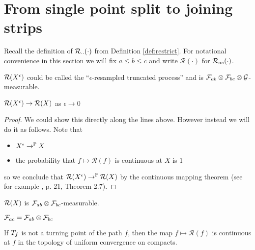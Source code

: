 {
\section{From single point split to joining strips}

\newcommand{\Res}[1]{\mathcal{R}(#1)}

Recall the definition of $\mathcal{R}_{{\cdot}{\cdot}}(\cdot)$ from
Definition \ref{def:restrict}.  For notational convenience in this
section we will fix $a \le b \le c$ and write $\Res{\cdot}$ for
$\mathcal{R}_{{a}{c}}(\cdot)$.

\newcommand{\AuB}{A \cup B}
\newcommand{\F}{\mathcal{F}}

\newcommand{\sampledT}{\sampled^T}
\newcommand{\sampledTe}{\sampled^{T,\epsilon}}
\newcommand{\resampledeT}{{\resamplede}^{,T}}

\begin{obs}
  $\Res{\resamplede}$ could be called the ``$\epsilon$-resampled
  truncated process'' and is $\mathcal{F}_{a b} \otimes \mathcal{F}_{b c}
  \otimes \mathcal{G}$-measurable.
\end{obs}

\begin{lemma}
  $\Res{\resamplede} \to \Res{\sampled}$ as $\epsilon \to 0$
\end{lemma}

\begin{proof}
  We could show this directly along the lines above.  However instead
  we will do it as follows.  Note that
  \begin{itemize}
  \item $X^{\epsilon} \to^{\mathbb{P}} X$
  \item the probability that $f \mapsto \Res{f}$ is continuous
    at $X$ is $1$
  \end{itemize}
  so we conclude that $\Res{\resamplede} \to^\P
  \Res{\sampled}$ by the continuous mapping theorem (see for
  example \cite{billingsley}, p. 21, Theorem 2.7).
\end{proof}

\begin{lemma}
  $\Res{\sampled}$ is $\mathcal{F}_{a b} \otimes
  \mathcal{F}_{b c}$-measurable.
\end{lemma}

\begin{theorem}
  $\mathcal{F}_{a c} = \mathcal{F}_{a b} \otimes \mathcal{F}_{b c}$
\end{theorem}

\begin{lemma}
  If $T_{f}$ is not a turning point of the path $f$,
  then the map $f \mapsto \Res{f}$ is continuous at $f$ in the
  topology of uniform convergence on compacts.
\end{lemma}

}
